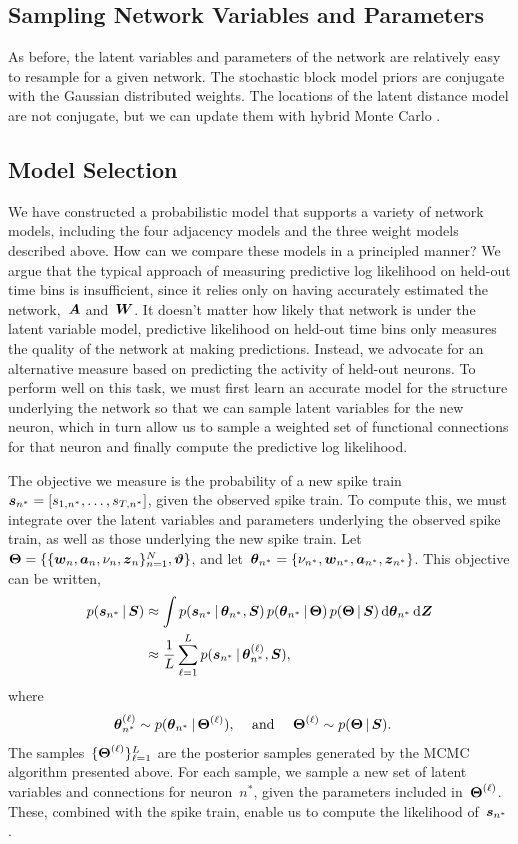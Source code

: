 \subsection{Sampling Network Variables and Parameters}
As before, the latent variables and parameters of the network are relatively 
easy to resample for a given network. The stochastic block model priors are 
conjugate with the Gaussian distributed weights. The locations of the latent 
distance model are not conjugate, but we can update them with hybrid Monte Carlo
\citep{Neal10}.

\subsection{Model Selection}
We have constructed a probabilistic model that supports a variety
of network models, including the four adjacency models and the three
weight models described above. How can we compare these models in
a principled manner? We argue that the typical approach of measuring
predictive log likelihood on held-out time bins is insufficient, since
it relies only on having accurately estimated the network,~$\boldsymbol{A}$ and~$\boldsymbol{W}$.
It doesn't matter how likely that network is under the latent variable
model, predictive likelihood on held-out time bins only measures the
quality of the network at making predictions. Instead, we advocate
for an alternative measure based on predicting the activity of held-out
neurons. To perform well on this task, we must first learn an accurate
model for the structure underlying the network so that we can
sample latent variables for the new neuron, which in turn allow us to
sample a weighted set of functional connections for that neuron and
finally compute the predictive log likelihood.

The objective we measure is the probability of a new spike
train~$\boldsymbol{s}_{n^*}=[s_{1,n^*}, \ldots, s_{T,n^*}]$, given the
observed spike train. To compute this, we must integrate
over the latent variables and parameters underlying the
observed spike train, as well as those underlying the
new spike train. 
Let~$\boldsymbol{\Theta} = \{\{\boldsymbol{w}_n, \boldsymbol{a}_n, \nu_n, \boldsymbol{z}_n\}_{n=1}^N, \boldsymbol{\vartheta}\}$, and
let~$\boldsymbol{\theta}_{n^*} = \{\nu_{n^*}, \boldsymbol{w}_{n^*}, \boldsymbol{a}_{n^*}, \boldsymbol{z}_{n^*}\}$.
This objective can be written,
\begin{align*}
  p(\boldsymbol{s}_{n^*} \,|\, \boldsymbol{S}) &\approx
  \int p(\boldsymbol{s}_{n^*} \,|\, \boldsymbol{\theta}_{n^*}, \boldsymbol{S}) \, p(\boldsymbol{\theta}_{n^*} \,|\, \boldsymbol{\Theta}) \, p(\boldsymbol{\Theta} \,|\, \boldsymbol{S}) \,
  \mathrm{d} \boldsymbol{\theta}_{n^*} \, \mathrm{d} \boldsymbol{Z} \\
  &\approx
  \frac{1}{L} \sum_{\ell=1}^L p(\boldsymbol{s}_{n^*} \,|\, \boldsymbol{\theta}_{n^*}^{(\ell)}, \boldsymbol{S}),
\end{align*}
where
\begin{align*}
  \boldsymbol{\theta}_{n^*}^{(\ell)} &\sim p(\boldsymbol{\theta}_{n^*} \,|\, \boldsymbol{\Theta}^{(\ell)}),
  &\text{ and }& & 
  \boldsymbol{\Theta}^{(\ell)} &\sim p(\boldsymbol{\Theta} \,|\, \boldsymbol{S}).
\end{align*}
The samples~$\{\boldsymbol{\Theta}^{(\ell)}\}_{\ell=1}^L$ are the posterior samples generated
by the MCMC algorithm presented above. For each sample, we
sample a new set of latent variables and connections for neuron~$n^*$,
given the parameters included in~$\boldsymbol{\Theta}^{(\ell)}$. These, combined with
the spike train, enable us to compute the likelihood of~$\boldsymbol{s}_{n^*}$.

